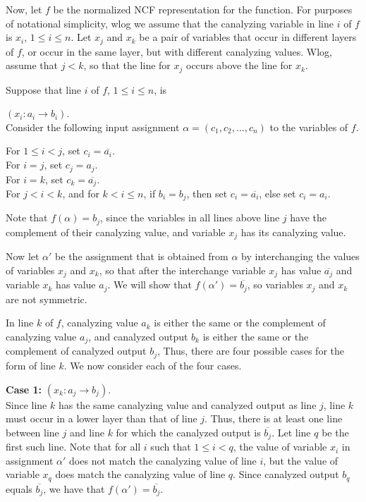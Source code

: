 Now, let $f$ be the normalized NCF representation for the function.
For purposes of notational simplicity, wlog we assume that the
canalyzing variable in line $i$ of $f$ is $x_i$, $1 \leq i \leq n$.
Let  $x_j$ and $x_k$ be a pair of variables that occur in different
layers of $f$, or occur in the same layer, but with different
canalyzing values.  Wlog, assume that $j < k$, so that the line for
$x_j$ occurs above the line for $x_k$.

Suppose that line $i$ of $f$, $1 \leq i \leq n$, is 

\noindent
$(x_i : a_i \rightarrow b_i)$. \\
Consider the following input assignment $\alpha = (c_1, c_2, \ldots,  c_n)$ 
to the variables of $f$.

\noindent
For $1 \leq i < j$, set $c_i = \overline{a_i}$. \\
For $i = j$, set $c_j =a_j$. \\
For $i = k$, set $c_k =\overline{a_j}$. \\
For $j < i < k$, and for  $k < i \leq n$, 
if $b_i = b_j$, then set $c_i =  \overline{a_i}$,
else set $c_i =  a_i$.

Note that $f(\alpha) = b_j$, since the variables in all lines above
line $j$ have the complement of their canalyzing value, and variable
$x_j$ has its canalyzing value.

Now let $\alpha'$ be the assignment that is obtained from $\alpha$
by interchanging the values of variables $x_j$ and $x_k$, so that
after the interchange variable $x_j$ has value $\overline{a_j}$ and
variable $x_k$ has value $a_j$.  We will show that $f(\alpha') =
\overline{b_j}$, so variables $x_j$ and $x_k$ are not symmetric.

In line $k$ of $f$, canalyzing value $a_k$ is either the same or
the complement of canalyzing value $a_j$, and canalyzed output $b_k$
is either the same or the complement of canalyzed output $b_j$,
Thus, there are four possible cases for the form of line $k$.  We
now consider each of the four cases.

{\bf Case 1:} $(x_k : a_j \rightarrow b_j)$. \\ Since line $k$ has
the same canalyzing value and canalyzed output as line $j$, line
$k$ must occur in a lower layer than that of line $j$.  Thus, there
is at least one line between line $j$ and line $k$ for which the
canalyzed output is $\overline{b_j}$.  Let line $q$ be the first
such line.  Note that for all $i$ such that $1 \leq i < q$, the
value of variable $x_i$ in assignment $\alpha'$ does not match the
canalyzing value of line $i$, but the value of variable $x_q$ does
match the canalyzing value of line $q$.  Since canalyzed output
$b_q$ equals $\overline{b_j}$, we have that $f(\alpha') =
\overline{b_j}$.

